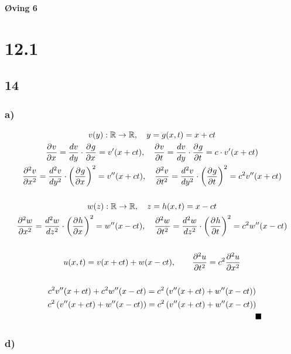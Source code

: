 \begin{center}
	\LARGE{\textbf{Øving 6}}
\end{center}


\section*{12.1}


\subsection*{14}


\subsubsection*{a)}

\begin{gather*}
	v(y): \mathbb{R} \rightarrow \mathbb{R}, \quad y = g(x, t) = x + c t
	\\
	\frac{\partial^{} v}{\partial x^{}}
	=
	\frac{d v}{d y} \cdot \frac{\partial^{} g}{\partial x^{}} = v'(x + c t),
	\quad
	\frac{\partial^{} v}{\partial t^{}}
	=
	\frac{d v}{d y} \cdot \frac{\partial^{} g}{\partial t^{}} = c \cdot v'(x + c t)
	\\
	\frac{\partial^{2} v}{\partial x^{2}}
	=
	\frac{d^2 v}{dy^2} \cdot \left(\frac{\partial^{} g}{\partial x^{}}\right)^2 = v''(x + c t),
	\quad
	\frac{\partial^{2} v}{\partial t^{2}}
	=
	\frac{d^2 v}{dy^2} \cdot \left(\frac{\partial^{} g}{\partial t^{}}\right)^2
	=
	c^2 v''(x + c t)
	\\
	\\
	w(z): \mathbb{R} \rightarrow \mathbb{R}, \quad z = h(x, t) = x - c t
	\\
	\frac{\partial^{2} w}{\partial x^{2}}
	=
	\frac{d^2 w}{dz^2} \cdot \left(\frac{\partial^{} h}{\partial x^{}}\right)^2 = w''(x - c t),
	\quad
	\frac{\partial^{2} w}{\partial t^{2}}
	=
	\frac{d^2 w}{dz^2} \cdot \left(\frac{\partial^{} h}{\partial t^{}}\right)^2
	=
	c^2 w''(x - c t)
	\\
	\\
	u(x, t) = v(x + c t) + w(x - c t),
	\qquad
	\frac{\partial^{2} u}{\partial t^{2}} = c^2 \frac{\partial^{2} u}{\partial x^{2}}
	\\
	\\
	c^2 v''(x + c t) + c^2 w''(x - c t)
	=
	c^2 \left(
		v''(x + c t) + w''(x - c t)
	\right)
	\\
	c^2 \left(
		v''(x + c t) + w''(x - c t)
	\right)
	=
	c^2 \left(
		v''(x + c t) + w''(x - c t)
	\right)
	\\
	\qquad\qquad\qquad\qquad\qquad\qquad\qquad\qquad\qquad\qquad\qquad\qquad\qquad \blacksquare
\end{gather*}


\subsubsection*{d)}


